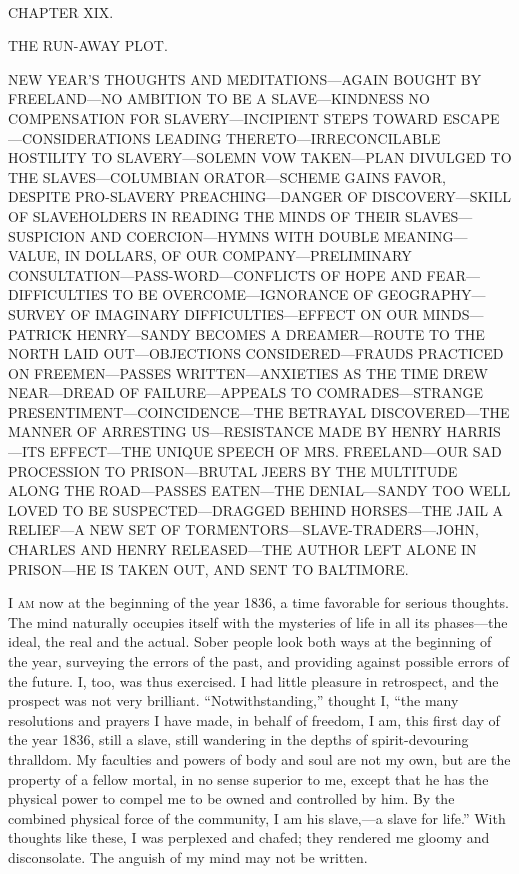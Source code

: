 {}

~

{CHAPTER XIX.}

THE RUN-AWAY PLOT.

{NEW YEAR'S THOUGHTS AND MEDITATIONS---AGAIN BOUGHT BY FREELAND---NO
AMBITION TO BE A SLAVE---KINDNESS NO COMPENSATION FOR
SLAVERY---INCIPIENT STEPS TOWARD ESCAPE---CONSIDERATIONS LEADING
THERETO---IRRECONCILABLE HOSTILITY TO SLAVERY---SOLEMN VOW TAKEN---PLAN
DIVULGED TO THE SLAVES---COLUMBIAN ORATOR---SCHEME GAINS FAVOR, DESPITE
PRO-SLAVERY PREACHING---DANGER OF DISCOVERY---SKILL OF SLAVEHOLDERS IN
READING THE MINDS OF THEIR SLAVES---SUSPICION AND COERCION---HYMNS WITH
DOUBLE MEANING---VALUE, IN DOLLARS, OF OUR COMPANY---PRELIMINARY
CONSULTATION---PASS-WORD---CONFLICTS OF HOPE AND FEAR---DIFFICULTIES TO
BE OVERCOME---IGNORANCE OF GEOGRAPHY---SURVEY OF IMAGINARY
DIFFICULTIES---EFFECT ON OUR MINDS---PATRICK HENRY---SANDY BECOMES A
DREAMER---ROUTE TO THE NORTH LAID OUT---OBJECTIONS CONSIDERED---FRAUDS
PRACTICED ON FREEMEN---PASSES WRITTEN---ANXIETIES AS THE TIME DREW
NEAR---DREAD OF FAILURE---APPEALS TO COMRADES---STRANGE
PRESENTIMENT---COINCIDENCE---THE BETRAYAL DISCOVERED---THE MANNER OF
ARRESTING US---RESISTANCE MADE BY HENRY HARRIS---ITS EFFECT---THE UNIQUE
SPEECH OF MRS. FREELAND---OUR SAD PROCESSION TO PRISON---BRUTAL JEERS BY
THE MULTITUDE ALONG THE ROAD---PASSES EATEN---THE DENIAL---SANDY TOO
WELL LOVED TO BE SUSPECTED---DRAGGED BEHIND HORSES---THE JAIL A
RELIEF---A NEW SET OF TORMENTORS---SLAVE-TRADERS---JOHN, CHARLES AND
HENRY RELEASED---THE AUTHOR LEFT ALONE IN PRISON---HE IS TAKEN OUT, AND
SENT TO BALTIMORE.}

\textsc{I am} now at the beginning of the year 1836, a time favorable
for serious thoughts. The mind naturally occupies itself with the
mysteries of life in all its phases---the ideal, the real and the
actual. Sober people look both ways at the beginning of the year,
surveying the errors of the past, and providing against possible errors
of the future. I, too, was thus exercised. I had little pleasure in
retrospect, and the {}prospect was not very brilliant.
``Notwithstanding,'' thought I, ``the many resolutions and prayers I
have made, in behalf of freedom, I am, this first day of the year 1836,
still a slave, still wandering in the depths of spirit-devouring
thralldom. My faculties and powers of body and soul are not my own, but
are the property of a fellow mortal, in no sense superior to me, except
that he has the physical power to compel me to be owned and controlled
by him. By the combined physical force of the community, I am his
slave,---a slave for life.'' With thoughts like these, I was perplexed
and chafed; they rendered me gloomy and disconsolate. The anguish of my
mind may not be written.

